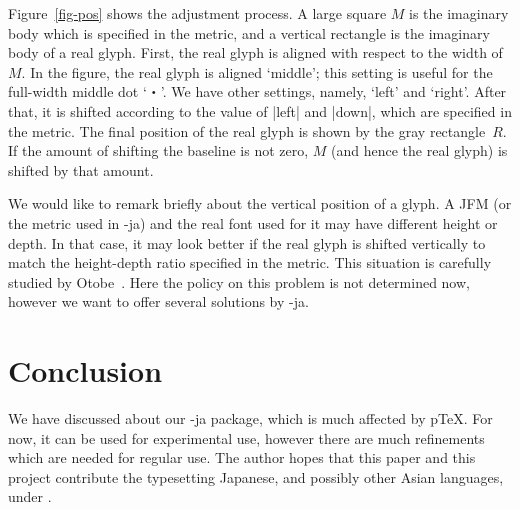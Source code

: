 \documentclass{ajt}
\begin{document}
Figure~\ref{fig-pos} shows the adjustment process. A large square $M$ is
the imaginary body which is specified in the metric, and a vertical
rectangle is the imaginary body of a real glyph. First, the real glyph
is aligned with respect to the width of $M$. In the figure, the real
glyph is aligned `middle'; this setting is useful for the full-width
middle dot `・'. We have other settings, namely, `left' and `right'.
After that, it is shifted according to the value of |left| and |down|,
which are specified in the metric. The final position of the real glyph
is shown by the gray rectangle~$R$. If the amount of shifting the baseline is
not zero, $M$ (and hence the real glyph) is shifted by that amount.

We would like to remark briefly about the vertical position of a glyph.
A JFM (or the metric used in \LuaTeX-ja) and the real font used for it
may have different height or depth.  In that case, it may look better if
the real glyph is shifted vertically to match the height-depth ratio
specified in the metric. This situation is carefully studied by
Otobe~\cite{min10}. Here the policy on this problem is not determined
now, however we want to offer several solutions by \LuaTeX-ja.

\section{Conclusion}
We have discussed about our \LuaTeX-ja package, which is much affected
by p\TeX. For now, it can be used for experimental use, however there
are much refinements which are needed for regular use. The author hopes
that this paper and this project contribute the typesetting Japanese,
and possibly other Asian languages, under \LuaTeX.
\end{document}

